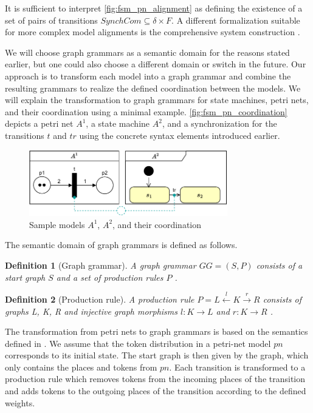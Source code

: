 \documentclass[conference]{IEEEtran}
\newtheorem{definition}{Definition}
\begin{document}
It is sufficient to interpret \autoref{fig:fsm_pn_alignment} as defining the existence of a set of pairs of transitions $SynchCom \subseteq \delta \times F$.
A different formalization suitable for more complex model alignments is the comprehensive system construction \cite{stunkelMultipleModelSynchronization2020}.

We will choose graph grammars as a semantic domain for the reasons stated earlier, but one could also choose a different domain or switch in the future.
Our approach is to transform each model into a graph grammar and combine the resulting grammars to realize the defined coordination between the models.
We will explain the transformation to graph grammars for state machines, petri nets, and their coordination using a minimal example.
\autoref{fig:fsm_pn_coordination} depicts a petri net $A^1$, a state machine $A^2$, and a synchronization for the transitions $t$ and $tr$ using the concrete syntax elements introduced earlier.

\begin{figure}[h]
    \centering
    \includegraphics[width=3.4in]{fsm_pn_sample}
    \caption{Sample models $A^1$, $A^2$, and their coordination}
    \label{fig:fsm_pn_coordination}
\end{figure}
The semantic domain of graph grammars is defined as follows.
\begin{definition}[Graph grammar] \label{def:graphGrammar}
A graph grammar $GG=(S, P)$ consists of a start graph $S$ and a set of production rules $P$ \cite{ehrigGraphGrammarsPetri2004}. 
\end{definition}
\begin{definition}[Production rule] \label{def:productionRule}
A production rule $P= L \overset{l}{\leftarrow} K \overset{r}{\to} R$ consists of graphs L, K, R and injective graph morphisms $l: K \to L$ and $r: K \to R$ \cite{ehrigGraphGrammarsPetri2004}. 
\end{definition}

The transformation from petri nets to graph grammars is based on the semantics defined in \cite{ehrigGraphGrammarsPetri2004}.
We assume that the token distribution in a petri-net model $pn$ corresponds to its initial state.
The start graph is then given by the graph, which only contains the places and tokens from $pn$.
Each transition is transformed to a production rule which removes tokens from the incoming places of the transition and adds tokens to the outgoing places of the transition according to the defined weights.
\end{document}
